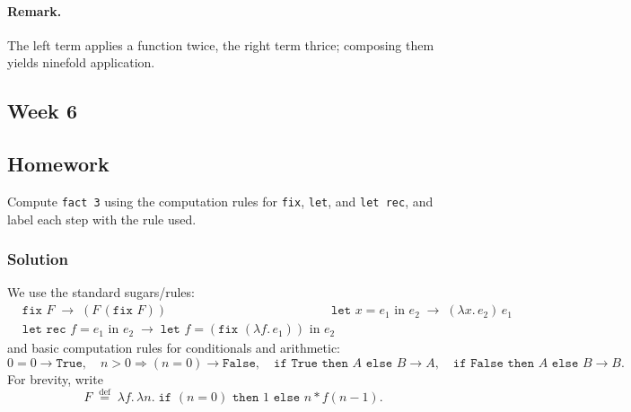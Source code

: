 \documentclass{article}
\theoremstyle{theorem}
\theoremstyle{definition}
\theoremstyle{remark}
\begin{document}
\paragraph{Remark.}
The left term applies a function twice, the right term thrice; composing them yields ninefold application.

\subsection{Week 6}\label{sec:week6}
\smallskip
\subsection*{Homework}
Compute \texttt{fact 3} using the computation rules for \texttt{fix}, \texttt{let}, and \texttt{let rec}, and label each step with the rule used.

\subsubsection*{Solution}
We use the standard sugars/rules:
\[
\begin{aligned}
&\texttt{fix } F \;\to\; (F\,(\texttt{fix } F)) \qquad
&&\texttt{let } x = e_1 \text{ in } e_2 \;\to\; (\lambda x.\,e_2)\,e_1 \\
&\texttt{let rec } f = e_1 \text{ in } e_2 \;\to\; \texttt{let } f = (\texttt{fix }(\lambda f.\,e_1)) \text{ in } e_2
\end{aligned}
\]
and basic computation rules for conditionals and arithmetic:
\[
0=0 \to \texttt{True},\quad n{>}0 \Rightarrow (n=0) \to \texttt{False},\quad
\texttt{if True then }A\texttt{ else }B \to A,\quad
\texttt{if False then }A\texttt{ else }B \to B.
\]
For brevity, write
\[
F \;\stackrel{\mathrm{def}}{=}\; \lambda f.\,\lambda n.\; \texttt{if }(n=0)\texttt{ then }1\texttt{ else }n * f(n-1).
\]
\end{document}
